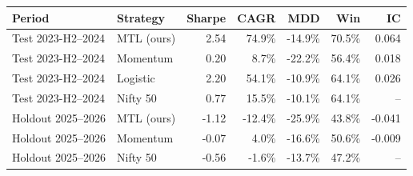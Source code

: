 \begin{tabular}{llrrrrr}
\toprule
Period & Strategy & Sharpe & CAGR & MDD & Win & IC \\
\midrule
Test 2023-H2--2024 & MTL (ours) & 2.54 & 74.9\% & -14.9\% & 70.5\% & 0.064 \\
Test 2023-H2--2024 & Momentum & 0.20 & 8.7\% & -22.2\% & 56.4\% & 0.018 \\
Test 2023-H2--2024 & Logistic & 2.20 & 54.1\% & -10.9\% & 64.1\% & 0.026 \\
Test 2023-H2--2024 & Nifty 50 & 0.77 & 15.5\% & -10.1\% & 64.1\% & -- \\
Holdout 2025--2026 & MTL (ours) & -1.12 & -12.4\% & -25.9\% & 43.8\% & -0.041 \\
Holdout 2025--2026 & Momentum & -0.07 & 4.0\% & -16.6\% & 50.6\% & -0.009 \\
Holdout 2025--2026 & Nifty 50 & -0.56 & -1.6\% & -13.7\% & 47.2\% & -- \\
\bottomrule
\end{tabular}
